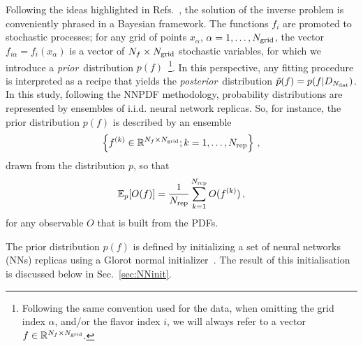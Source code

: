 Following the ideas highlighted in
Refs.~\cite{DelDebbio:2021whr,Candido:2024hjt}, the solution of the inverse
problem is conveniently phrased in a Bayesian framework. The functions $f_i$ are
promoted to stochastic processes; for any grid of points $x_{\alpha}$,
$\alpha=1, \ldots, N_{\mathrm{grid}}$, the vector $f_{i\alpha}=f_{i}(x_{\alpha})$ is a
vector of $N_{f}\times N_{\mathrm{grid}}$ stochastic variables, for which we introduce a
{\em prior}\ distribution $p(f)$~\footnote{Following the same convention used for the
data, when omitting the grid index $\alpha$, and/or the flavor index $i$, we
will always refer to a vector $f \in \mathbb{R}^{N_{f}\times N_{\mathrm{grid}}}$.}. In this
perspective, any fitting procedure is interpreted as a recipe that yields the
{\em posterior}\ distribution $\tilde{p}(f) = p(f | D_{N_{\mathrm{dat}}})$.
In this study, following the NNPDF methodology, probability distributions are represented by
ensembles of i.i.d. neural network replicas. So, for instance, the prior
distribution $p(f)$ is described by an ensemble
\begin{equation}
    \label{eq:RepDef}
    \left\{f^{(k)} \in \mathbb{R}^{N_{f}\times N_{\mathrm{grid}}}; k=1, \ldots, N_{\rm rep}\right\}\, ,
\end{equation}
drawn from the distribution $p$, so that
\begin{equation}
    \label{eq:ReplicaEnsemble}
    \mathbb{E}_{p}[O(f)] = \frac{1}{N_{\rm rep}} \sum_{k=1}^{N_{\rm rep}} O(f^{(k)})\, ,
\end{equation}
for any observable $O$ that is built from the PDFs.

The prior distribution $p(f)$ is defined by initializing a set of neural networks (NNs) 
replicas using a Glorot normal initializer~\cite{glorot2010understanding}. The result of this
initialisation is discussed below in Sec.~\ref{sec:NNinit}.

